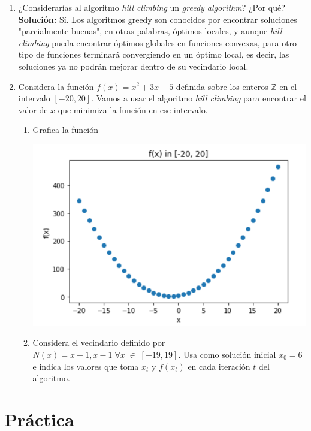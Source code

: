 \documentclass[10pt,letterpaper]{article}
\begin{document}
\begin{enumerate}
        \item ¿Considerarías al algoritmo \textit{hill climbing} un \textit{greedy algorithm}?
              ¿Por qué? \\

              \textbf{Solución:} Sí. Los algoritmos greedy son conocidos por encontrar
              soluciones "parcialmente buenas", en otras palabras, óptimos locales, y
              aunque \textit{hill climbing} pueda encontrar óptimos globales en funciones
              convexas, para otro tipo de funciones terminará convergiendo en un óptimo
              local, es decir, las soluciones ya no podrán mejorar dentro de su vecindario
              local.

        \clearpage

        \item Considera la función $f(x) = x^2 + 3x + 5$ definida sobre los enteros
              $\mathbb{Z}$ en el intervalo $[-20, 20]$. Vamos a usar el algoritmo
              \textit{hill climbing} para encontrar el valor de $x$ que minimiza
              la función en ese intervalo.

              \begin{enumerate}
                  \item Grafica la función
                        \begin{center}
                            \includegraphics[scale=.5]{assets/theory/5-a/f-plot.png}
                        \end{center}
                  \item Considera el vecindario definido por
                  $N(x) = {x + 1, x - 1} \; \forall x \; \in \; [-19, 19]$. Usa
                  como solución inicial $x_0=6$ e indica los valores que toma
                  $x_t$ y $f(x_t)$ en cada iteración $t$ del algoritmo.
              \end{enumerate}
    \end{enumerate}

\section{Práctica}
\end{document}
